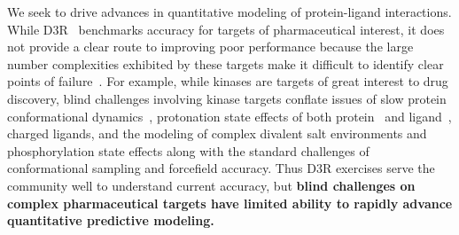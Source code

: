 \documentclass[11pt]{article}
\begin{document}
We seek to drive advances in quantitative modeling of protein-ligand interactions.
While D3R~\cite{gathiaka_d3r_2016} benchmarks accuracy for targets of pharmaceutical interest, it does not provide a clear route to improving poor performance because the large number complexities exhibited by these targets make it difficult to identify clear points of failure~\cite{ignjatovic_binding-affinity_2016, deng_large_2016, sunseri_d3r_2016, gathiaka_d3r_2016}.
For example, while kinases are targets of great interest to drug discovery, blind challenges involving kinase targets conflate issues of slow protein conformational dynamics~\cite{Lin:2013:Proc.Natl.Acad.Sci.}, protonation state effects of both protein~\cite{Shan:2009:PNAS} and ligand~\cite{Szakacs:2005:JournalofMedicinalChemistry,Grante:2014:SpectrochimicaActaPartA:MolecularandBiomolecularSpectroscopy}, charged ligands, and the modeling of complex divalent salt environments and phosphorylation state effects along with the standard challenges of conformational sampling and forcefield accuracy.
Thus D3R exercises serve the community well to understand current accuracy, but {\bf blind challenges on complex pharmaceutical targets have limited ability to rapidly advance quantitative predictive modeling.}
\end{document}
